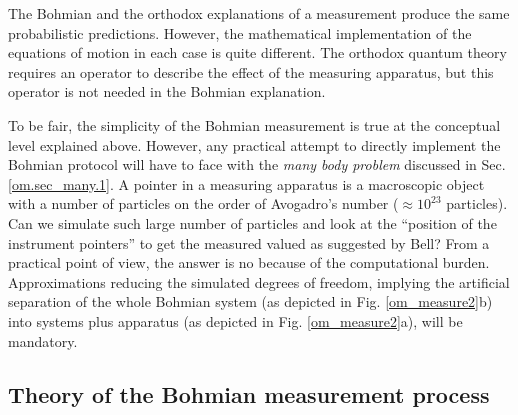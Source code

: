 \documentclass[nofootinbib, secnumarabic, amsmath, nobibnotes,11pt,aps,pra, floatfix]{revtex4-1}
\newcommand{\fref}[1]{Fig. \ref{#1}}
\newcommand{\sref}[1]{Sec. \ref{#1}}
\begin{document}
The Bohmian and the orthodox explanations of a measurement produce the same probabilistic predictions. However, the mathematical implementation of the equations of motion in each case is quite different. The orthodox quantum theory requires an operator to describe the effect of the measuring apparatus, but this operator is not needed in the Bohmian explanation.

To be fair, the simplicity of the Bohmian measurement is true at the conceptual level explained above. However, any practical attempt to directly implement the Bohmian protocol will have to face with the \emph{many body problem} discussed in \sref{om.sec_many.1}. A pointer in a measuring apparatus is a macroscopic object with a number of particles on the order of  Avogadro's number ($\approx 10^{23}$ particles). Can we simulate such large number of particles and look at the ``position of the instrument pointers'' to get the measured valued as suggested by Bell? From a practical point of view, the answer is no because of the computational burden. Approximations reducing the simulated degrees of freedom, implying the artificial separation of the whole Bohmian system (as depicted in \fref{om_measure2}b) into systems plus apparatus (as depicted in \fref{om_measure2}a), will be mandatory.


\subsection{Theory of the Bohmian measurement process}
\label{om.sec_measurement.1}
\end{document}
